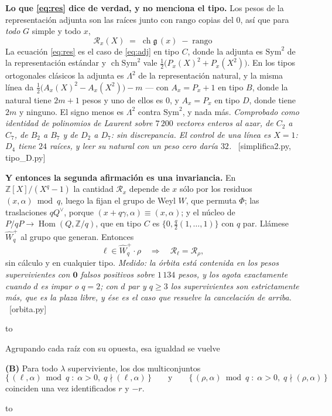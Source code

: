 \documentclass[11pt,a4paper]{article}
\newcommand{\ver}[1]{\unskip\penalty0\ \textcolor{azul}{\small\textsf{[#1]}}}
\newenvironment{keybox}
  {\par\vspace{9pt}\begin{lrbox}{\fichabox}%
   \begin{minipage}{0.90\textwidth}\vspace{7pt}\setlength{\parskip}{3pt}}
  {\vspace{7pt}\end{minipage}\end{lrbox}%
   \par\noindent\hbox to \textwidth{\hfill
   \textcolor{azul}{\rule[-\dp\fichabox]{3.2pt}{\dimexpr\ht\fichabox+\dp\fichabox\relax}}%
   \colorbox{fondoficha}{\usebox{\fichabox}}\hfill}%
   \par\vspace{9pt}}
\begin{document}
\begin{keybox}
\textbf{Lo que \eqref{eq:res} dice de verdad, y no menciona el tipo.} Los pesos de la representación
adjunta son las raíces junto con $\mathrm{rango}$ copias del $0$, así que para \emph{todo} $G$ simple
y todo $x$,
\begin{equation}\label{eq:adj}
\boxed{\;\mathscr{R}_x(X)\;=\;\operatorname{ch}\mathfrak g\,(x)\;-\;\mathrm{rango}\;}
\end{equation}
La ecuación \eqref{eq:res} es el caso de \eqref{eq:adj} en tipo $C$, donde la adjunta es
$\mathrm{Sym}^2$ de la representación estándar y $\operatorname{ch}\mathrm{Sym}^2$ vale
$\tfrac12\bigl(P_x(X)^2+P_x(X^2)\bigr)$. En los tipos ortogonales clásicos la adjunta es
$\Lambda^2$ de la representación natural, y la misma línea da
$\tfrac12\bigl(A_x(X)^2-A_x(X^2)\bigr)-m$ --- con $A_x=P_x+1$ en tipo $B$, donde la natural
tiene $2m+1$ pesos y uno de ellos es $0$, y $A_x=P_x$ en tipo $D$, donde tiene $2m$ y ninguno.
El signo menos es $\Lambda^2$ contra $\mathrm{Sym}^2$, y nada más. \emph{Comprobado como
identidad de polinomios de Laurent sobre $7\,200$ vectores enteros al azar, de $C_2$ a $C_7$, de
$B_2$ a $B_7$ y de $D_2$ a $D_7$: sin discrepancia. El control de una línea es $X=1$: $D_4$
tiene $24$ raíces, y leer su natural con un peso cero daría $32$.}
\ver{simplifica2.py, tipo\_D.py}

\smallskip
\textbf{Y entonces la segunda afirmación es una invariancia.} En $\mathbb{Z}[X]/(X^q-1)$ la cantidad
$\mathscr{R}_x$ depende de $x$ sólo por los residuos $(x,\alpha)\bmod q$, luego la fijan el grupo de
Weyl $W$, que permuta $\Phi$; las traslaciones $qQ^\vee$, porque $(x+q\gamma,\alpha)\equiv(x,\alpha)$;
y el núcleo de $P/qP\to\operatorname{Hom}(Q,\mathbb{Z}/q)$, que en tipo $C$ es $\{0,\tfrac q2(1,\dots,1)\}$
con $q$ par. Llámese $\widehat W_q^{+}$ al grupo que generan. Entonces
\[
\ell\in \widehat W_q^{+}\!\cdot\rho \quad\Longrightarrow\quad \mathscr{R}_\ell=\mathscr{R}_\rho ,
\]
sin cálculo y en cualquier tipo. \emph{Medido: la órbita está contenida en los pesos supervivientes
con $\mathbf{0}$ falsos positivos sobre $1\,134$ pesos, y los agota exactamente cuando $d$ es impar
o $q=2$; con $d$ par y $q\ge3$ los supervivientes son estrictamente más, que es la plaza libre, y
ése es el caso que resuelve la cancelación de arriba.} \ver{orbita.py}
\end{keybox}

\noindent Agrupando cada raíz con su opuesta, esa igualdad se vuelve

\begin{keybox}
\textbf{(B)} \quad Para todo $\lambda$ superviviente, los dos multiconjuntos
\[
\bigl\{\,(\ell,\alpha)\bmod q \;:\; \alpha>0,\; q\nmid(\ell,\alpha)\,\bigr\}
\qquad\text{y}\qquad
\bigl\{\,(\rho,\alpha)\bmod q \;:\; \alpha>0,\; q\nmid(\rho,\alpha)\,\bigr\}
\]
coinciden una vez identificados $r$ y $-r$.
\end{keybox}
\end{document}

